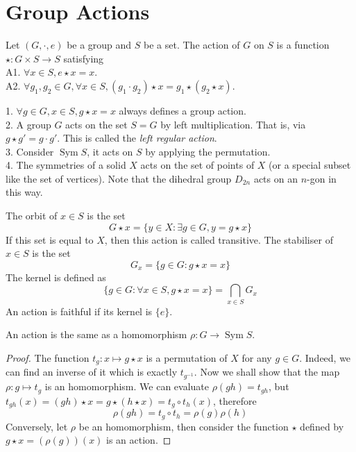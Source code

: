 \section{Group Actions}
\begin{definition}
    Let $(G,\cdot,e)$ be a group and $S$ be a set.
    The action of $G$ on $S$ is a function $\star:G\times S\to S$ satisfying\\
    A1. $\forall x\in S,e\star x=x$.\\
    A2. $\forall g_1,g_2\in G, \forall x\in S, (g_1\cdot g_2)\star x=g_1\star(g_2\star x)$.
\end{definition}
\begin{example}
    1. $\forall g\in G, x\in S, g\star x=x$ always defines a group action.\\
    2. A group $G$ acts on the set $S=G$ by left multiplication.
    That is, via $g\star g'=g\cdot g'$.
    This is called the \textit{left regular action}.\\
    3. Consider $\operatorname{Sym}S$, it acts on $S$ by applying the permutation.\\
    4. The symmetries of a solid $X$ acts on the set of points of $X$ (or a special subset like the set of vertices).
    Note that the dihedral group $D_{2n}$ acts on an $n$-gon in this way.
\end{example}
\begin{definition}
    The orbit of $x\in S$ is the set
    $$G\star x=\{y\in X:\exists g\in G,y=g\star x\}$$
    If this set is equal to $X$, then this action is called transitive.
    The stabiliser of $x\in S$ is the set
    $$G_x=\{g\in G:g\star x=x\}$$
    The kernel is defined as
    $$\{g\in G:\forall x\in S,g\star x=x\}=\bigcap_{x\in S}G_x$$
    An action is faithful if its kernel is $\{e\}$.
\end{definition}
\begin{theorem}
    An action is the same as a homomorphism $\rho:G\to\operatorname{Sym}S$.
\end{theorem}
\begin{proof}
    The function $t_g:x\mapsto g\star x$ is a permutation of $X$ for any $g\in G$.
    Indeed, we can find an inverse of it which is exactly $t_{g^{-1}}$.
    Now we shall show that the map $\rho:g\mapsto t_g$ is an homomorphism.
    We can evaluate $\rho(gh)=t_{gh}$, but $t_{gh}(x)=(gh)\star x=g\star(h\star x)=t_g\circ t_h(x)$, therefore
    $$\rho(gh)=t_g\circ t_h=\rho(g)\rho(h)$$
    Conversely, let $\rho$ be an homomorphism, then consider the function $\star$ defined by $g\star x=(\rho(g))(x)$ is an action.
\end{proof}
